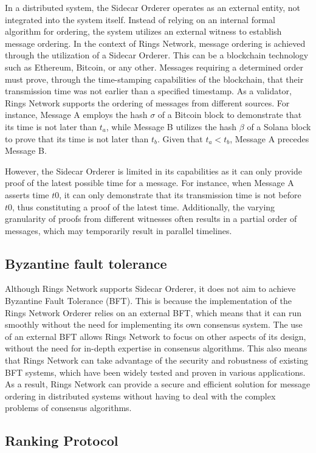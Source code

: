 \documentclass[twocolumn]{article}
\begin{document}
In a distributed system, the Sidecar Orderer operates as an external entity, not integrated into the system itself. Instead of relying on an internal formal algorithm for ordering, the system utilizes an external witness to establish message ordering.
In the context of Rings Network, message ordering is achieved through the utilization of a Sidecar Orderer. This can be a blockchain technology such as Ethereum, Bitcoin, or any other. Messages requiring a determined order must prove, through the time-stamping capabilities of the blockchain, that their transmission time was not earlier than a specified timestamp.
As a validator, Rings Network supports the ordering of messages from different sources. For instance, Message A employs the hash $\sigma$ of a Bitcoin block to demonstrate that its time is not later than $t_a$, while Message B utilizes the hash $\beta$ of a Solana block to prove that its time is not later than $t_b$. Given that $t_a < t_b$, Message A precedes Message B.

However, the Sidecar Orderer is limited in its capabilities as it can only provide proof of the latest possible time for a message. For instance, when Message A asserts time $t0$, it can only demonstrate that its transmission time is not before $t0$, thus constituting a proof of the latest time. Additionally, the varying granularity of proofs from different witnesses often results in a partial order of messages, which may temporarily result in parallel timelines.


\subsection{Byzantine fault tolerance}
Although Rings Network supports Sidecar Orderer, it does not aim to achieve Byzantine Fault Tolerance (BFT). This is because the implementation of the Rings Network Orderer relies on an external BFT, which means that it can run smoothly without the need for implementing its own consensus system. The use of an external BFT allows Rings Network to focus on other aspects of its design, without the need for in-depth expertise in consensus algorithms. This also means that Rings Network can take advantage of the security and robustness of existing BFT systems, which have been widely tested and proven in various applications. As a result, Rings Network can provide a secure and efficient solution for message ordering in distributed systems without having to deal with the complex problems of consensus algorithms.

\subsection{Ranking Protocol}
\end{document}
